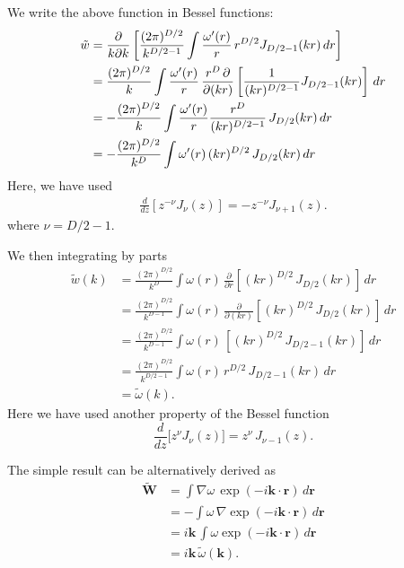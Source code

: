 \documentclass[preprint]{revtex4-1}
\numberwithin{equation}{subsection}
\numberwithin{table}{section}
\newcommand{\vct}[1]{\mathbf{#1}}
\providecommand{\vr}{} %
\renewcommand{\vr}{\vct{r}}
\newcommand{\vk}{\vct{k}}
\begin{document}
We write the above function in Bessel functions:
\begin{align}
  \tilde{w}
&=
\frac{\partial}{k\partial k}
\left[
\frac{(2\pi)^{D/2}}{k^{D/2-1}}
\int \frac{\omega'(r)}{r} \, r^{D/2} J_{D/2-1}(kr) \, dr
\right]
\notag \\
&=
\frac{(2\pi)^{D/2}}{k}
\int
\frac{\omega'(r)}{r}
\,
\frac{r^D \, \partial}{\partial (kr)}
\left[
\frac{1}{(kr)^{D/2-1}}
  J_{D/2-1}(kr)
\right]
\, dr
\notag \\
&=
-
\frac{(2\pi)^{D/2}}{k}
\int
\frac{\omega'(r)}{r}
\frac{r^D}
{
(kr)^{D/2-1}
}
\, J_{D/2}(kr) \, dr
\notag \\
&=
-
\frac{(2\pi)^{D/2}}{k^D}
\int
\omega'(r) \, (kr)^{D/2}
\, J_{D/2}(kr) \, dr
\label{eq:wbessel1}
\end{align}
Here, we have used
\begin{align*}
  \frac{d}{dz} [z^{-\nu} J_\nu(z)] = -z^{-\nu} J_{\nu+1}(z).
\end{align*}
where $\nu = D/2-1$.


We then integrating by parts
\begin{align*}
\tilde{w}(k)
&=
\frac{(2\pi)^{D/2}}{k^D}
\int
\omega(r) \,
\frac{\partial }{\partial r}
\left[
  (kr)^{D/2}
  \, J_{D/2}(kr)
\right]
\, dr
\\
&=
\frac{(2\pi)^{D/2}}{k^{D-1}}
\int
\omega(r) \,
\frac{\partial }{\partial (kr)}
\left[
  (kr)^{D/2}
  \, J_{D/2}(kr)
\right]
\, dr
\\
&=
\frac{(2\pi)^{D/2}}{k^{D-1}}
\int
\omega(r) \,
\left[
  (kr)^{D/2}
  \, J_{D/2-1}(kr)
\right]
\, dr
\\
&=
\frac{(2\pi)^{D/2}}{k^{D/2-1}}
\int
\omega(r) \,
  r^{D/2}
  \, J_{D/2-1}(kr)
\, dr
\\
&=\tilde\omega(k).
\end{align*}
Here we have used another property of the Bessel function
\[
  \frac{d}{dz} \Big[ z^\nu J_\nu(z) \Big]
=
  z^\nu \, J_{\nu - 1}(z).
\]

The simple result can be alternatively derived as
\begin{align*}
  \tilde{\vct{W}}
&=
\int \nabla \omega \, \exp(-i\vk \cdot \vr) \, d\vr
\\
&=
-\int \omega \, \nabla \exp(-i\vk \cdot \vr) \, d\vr
\\
&=
i \vk \, \int \omega \exp(-i\vk \cdot \vr) \, d\vr
\\
&=
i \vk \, \tilde{\omega}(\vk).
\end{align*}
\end{document}

